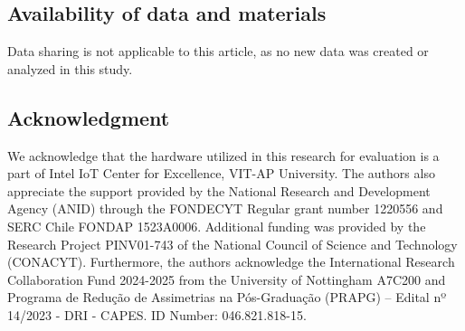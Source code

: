 \documentclass[a4paper,fleqn]{cas-dc}
\numberwithin{equation}{section}
\begin{document}
\subsection*{Availability of data and materials}
Data sharing is not applicable to this article, as no new data was created or analyzed in this study.

\subsection*{Acknowledgment}
We acknowledge that the hardware utilized in this research for evaluation is a part of Intel IoT Center for Excellence, VIT-AP University.  The authors also appreciate the support provided by the National Research and Development Agency (ANID) through the FONDECYT Regular grant number 1220556 and SERC Chile FONDAP 1523A0006. Additional funding was provided by the Research Project PINV01-743 of the National Council of Science and Technology (CONACYT). Furthermore, the authors acknowledge the International Research Collaboration Fund 2024-2025 from the University of Nottingham A7C200 and Programa de Redução de Assimetrias na Pós-Graduação (PRAPG) – Edital nº 14/2023 - DRI - CAPES. ID Number: 046.821.818-15. 



\end{document}
